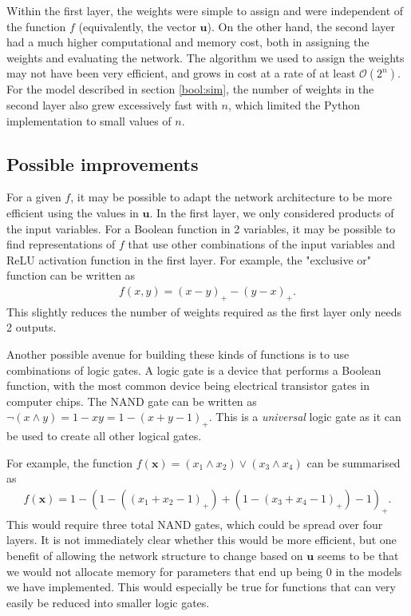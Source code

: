 \documentclass{somasmsc}
\begin{document}
Within the first layer, the weights were simple to assign and were independent of the function $f$ (equivalently, the vector $\pmb{u}$). On the other hand, the second layer had a much higher computational and memory cost, both in assigning the weights and evaluating the network. The algorithm we used to assign the weights may not have been very efficient, and grows in cost at a rate of at least $\mathcal{O}\left(2^n\right)$. For the model described in section \ref{bool:sim}, the number of weights in the second layer also grew excessively fast with $n$, which limited the Python implementation to small values of $n$.

\subsection{Possible improvements}

For a given $f$, it may be possible to adapt the network architecture to be more efficient using the values in $\pmb{u}$. In the first layer, we only considered products of the input variables. For a Boolean function in 2 variables, it may be possible to find representations of $f$ that use other combinations of the input variables and ReLU activation function in the first layer. For example, the "exclusive or" function can be written as
\begin{align*}
f\left(x, y\right) = \left(x - y\right)_+ - \left(y - x\right)_+.
\end{align*}
This slightly reduces the number of weights required as the first layer only needs 2 outputs.

Another possible avenue for building these kinds of functions is to use combinations of logic gates. A logic gate is a device that performs a Boolean function, with the most common device being electrical transistor gates in computer chips. The NAND gate can be written as $\lnot\left(x \land y\right) = 1 - xy = 1 - \left(x + y - 1\right)_+$. This is a \textit{universal} logic gate as it can be used to create all other logical gates.

For example, the function $f\left(\pmb{x}\right) = \left(x_1 \land x_2\right) \lor \left(x_3 \land x_4\right)$ can be summarised as
\begin{align*}
f\left(\pmb{x}\right) = 1 - \left(1 - \left(\left(x_1 + x_2 - 1\right)_+\right) + \left(1 - \left(x_3 + x_4 - 1\right)_+\right) - 1\right)_+.
\end{align*}
This would require three total NAND gates, which could be spread over four layers. It is not immediately clear whether this would be more efficient, but one benefit of allowing the network structure to change based on $\pmb{u}$ seems to be that we would not allocate memory for parameters that end up being 0 in the models we have implemented. This would especially be true for functions that can very easily be reduced into smaller logic gates.
\end{document}
